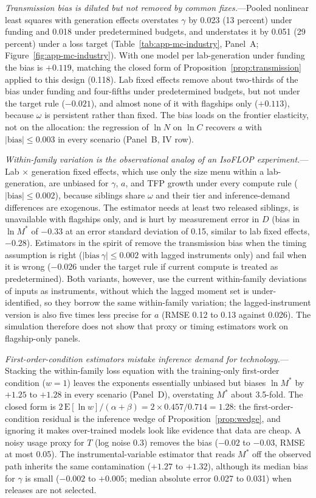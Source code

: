 \emph{Transmission bias is diluted but not removed by common fixes.}---Pooled nonlinear least squares with
generation effects overstates $\gamma$ by 0.023 (13 percent) under funding and 0.018 under predetermined budgets,
and understates it by 0.051 (29 percent) under a loss target (Table~\ref{tab:app-mc-industry}, Panel~A;
Figure~\ref{fig:app-mc-industry}). With one
model per lab-generation under funding the bias is $+0.119$, matching the closed form of
Proposition~\ref{prop:transmission} applied to this design (0.118). Lab fixed effects remove about two-thirds of
the bias under funding and four-fifths under predetermined budgets, but not under the target rule ($-0.021$), and
almost none of it with flagships only ($+0.113$), because $\omega$ is persistent rather than fixed. The bias loads
on the frontier elasticity, not on the allocation: the regression of $\ln N$ on $\ln C$ recovers $a$ with
$|\text{bias}|\le0.003$ in every scenario (Panel~B, IV row).

\emph{Within-family variation is the observational analog of an IsoFLOP experiment.}---Lab $\times$ generation
fixed effects, which use only the size menu within a lab-generation, are unbiased for $\gamma$, $a$, and TFP
growth under every compute rule ($|\text{bias}|\le0.002$), because siblings share $\omega$ and their tier and
inference-demand differences are exogenous. The estimator needs at least two released siblings, is unavailable
with flagships only, and is hurt by measurement error in $D$ (bias in $\ln M^*$ of $-0.33$ at an error standard
deviation of 0.15, similar to lab fixed effects, $-0.28$). Estimators in the spirit of
\citet{ackerberg2015identification} remove the transmission bias when the timing assumption is right
($|\text{bias}\ \gamma|\le0.002$ with lagged instruments only) and fail when it is wrong ($-0.026$ under the
target rule if current compute is treated as predetermined). Both variants, however, use the current
within-family deviations of inputs as instruments, without which the lagged moment set is under-identified, so they
borrow the same within-family variation; the lagged-instrument version is also five times less precise for $a$
(RMSE 0.12 to 0.13 against 0.026). The simulation therefore does not show that proxy or timing estimators work on flagship-only panels.

\emph{First-order-condition estimators mistake inference demand for technology.}---Stacking the within-family
loss equation with the training-only first-order condition ($w=1$) leaves the exponents essentially unbiased but
biases $\ln M^*$ by $+1.25$ to $+1.28$ in every scenario (Panel~D), overstating $M^*$ about 3.5-fold. The closed
form is $2\,\mathrm{E}[\ln w]/(\alpha+\beta)=2\times0.457/0.714=1.28$: the first-order-condition residual is the
inference wedge of Proposition~\ref{prop:wedge}, and ignoring it makes over-trained models look like evidence
that data are cheap. A noisy usage proxy for $T$ (log noise 0.3) removes the bias ($-0.02$ to $-0.03$, RMSE at
most 0.05). The instrumental-variable estimator that reads $M^*$ off the observed path inherits the same
contamination ($+1.27$ to $+1.32$), although its median bias for $\gamma$ is small ($-0.002$ to $+0.005$; median
absolute error 0.027 to 0.031) when releases are not selected.

